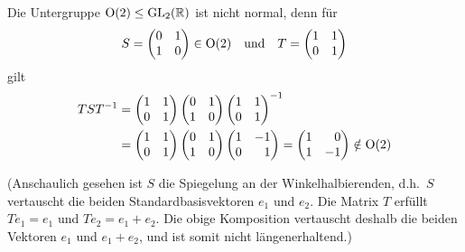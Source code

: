 Die Untergruppe $\operatorname{O}(2) \leq \operatorname{GL}_{2}(\mathbb{R})$ ist nicht normal, denn für
\[
    S
  = \begin{pmatrix}
      0 & 1 \\
      1 & 0
    \end{pmatrix}
  \in \operatorname{O}(2)
  \quad\text{und}\quad
    T
  = \begin{pmatrix}
      1 & 1 \\
      0 & 1
    \end{pmatrix}
\]
gilt
\begin{align*}
      T S T^{-1}
  &=  \begin{pmatrix}
        1 & 1 \\
        0 & 1
      \end{pmatrix}
      \begin{pmatrix}
        0 & 1 \\
        1 & 0
      \end{pmatrix}
      \begin{pmatrix}
        1 & 1 \\
        0 & 1
      \end{pmatrix}^{-1}
  \\
  &=  \begin{pmatrix}
        1 & 1 \\
        0 & 1
      \end{pmatrix}
      \begin{pmatrix}
        0 & 1 \\
        1 & 0
      \end{pmatrix}
      \begin{pmatrix*}[r]
        1 & -1 \\
        0 &  1
      \end{pmatrix*}
  =   \begin{pmatrix*}[r]
        1 &  0  \\
        1 & -1
      \end{pmatrix*}
  \notin \orthogonal{2}
\end{align*}

(Anschaulich gesehen ist $S$ die Spiegelung an der Winkelhalbierenden, d.h.\ $S$ vertauscht die beiden Standardbasisvektoren $e_1$ und $e_2$.
Die Matrix $T$ erfüllt $Te_1 = e_1$ und $Te_2 = e_1 + e_2$.
Die obige Komposition vertauscht deshalb die beiden Vektoren $e_1$ und $e_1 + e_2$, und ist somit nicht längenerhaltend.)





\subsection{}

